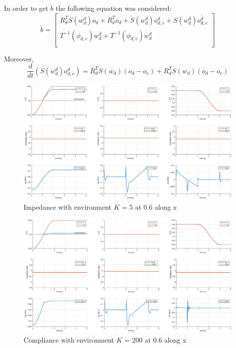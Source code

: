 \documentclass[a4paper,12pt]{article}
\begin{document}
In order to get $\dot{b}$ the following equation was considered:
\[
    \dot{b} = \begin{bmatrix}
        R_d^T S(w_d^d)\dot{o_d} + R_d^T\ddot{o_d} + \dot{S}(w_d^d)o_{d,e}^d + S(w_d^d)\dot{o_{d,e}^d}\\ 
    \dot{T^{-1}}(\phi_{d,e})w_d^d + T^{-1}(\phi_{d,e})\dot{w_d^d} \\
    \end{bmatrix}
\]

Moreover,
\[
    \frac{d}{dt}\left(S(w_d^d)o_{d,e}^d \right)= R_d^TS(\dot{w_d})(o_d - o_e) + R_d^{T}S(w_d)(\dot{o_d} - \dot{o_e})
\]
\begin{figure}[H]
    \begin{center}
        \hspace*{-4.5cm}
        \includegraphics[scale=0.5]{images/impendance_soft.eps}
    \end{center}
    \caption{Impedance with environment $K$ = 5 at 0.6 along x}
    \label{fig:impedance_soft}
\end{figure}

\begin{figure}[H]
    \begin{center}
        \hspace*{-4.5cm}
        \includegraphics[scale=0.5]{images/impendance_stiff.eps}
    \end{center}
    \caption{Compliance with environment $K$ = 200 at 0.6 along x}
    \label{fig:impedance_stiff}
\end{figure}
\end{document}

